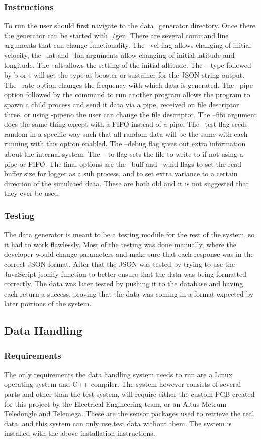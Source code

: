 \documentclass[onecolumn, draftclsnofoot,10pt, compsoc]{IEEEtran}
\begin{document}
\subsubsection{Instructions}
To run the user should first navigate to the data\_generator directory. Once there the generator can be started with ./gen. There are several command line arguments that can change functionality. The –vel flag allows changing of initial velocity, the –lat and –lon arguments allow changing of initial latitude and longitude. The –alt allows the setting of the initial altitude. The – type followed by b or s will set the type as booster or sustainer for the JSON string output. The –rate option changes the frequency with which data is generated. The –pipe option followed by the command to run another program allows the program to spawn a child process and send it data via a pipe, received on file descriptor three, or using -pipeno the user can change the file descriptor. The –fifo argument does the same thing except with a FIFO instead of a pipe. The –test flag seeds random in a specific way such that all random data will be the same with each running with this option enabled. The –debug flag gives out extra information about the internal system. The – to flag sets the file to write to if not using a pipe or FIFO. The final options are the –buff and –wind flags to set the read buffer size for logger as a sub process, and to set extra variance to a certain direction of the simulated data. These are both old and it is not suggested that they ever be used.
\subsubsection{Testing}
The data generator is meant to be a testing module for the rest of the system, so it had to work flawlessly. Most of the testing was done manually, where the developer would change parameters and make sure that each response was in the correct JSON format. After that the JSON was tested by trying to use the JavaScript jsonify function to better ensure that the data was being formatted correctly. The data was later tested by pushing it to the database and having each return a success, proving that the data was coming in a format expected by later portions of the system.
\subsection{Data Handling}
\subsubsection{Requirements}
The only requirements the data handling system needs to run are a Linux operating system and C++ compiler. The system however consists of several parts and other than the test system, will require either the custom PCB created for this project by the Electrical Engineering team, or an Altus Metrum Teledongle and Telemega. These are the sensor packages used to retrieve the real data, and this system can only use test data without them. The system is installed with the above installation instructions.
\end{document}
